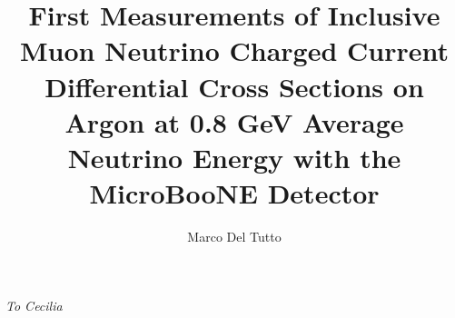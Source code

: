 \documentclass[a4paper, oneside, openany, 12pt]{book}
\begin{document}
\title{First Measurements of Inclusive Muon Neutrino Charged Current Differential Cross Sections on Argon at 0.8 GeV Average Neutrino Energy with the MicroBooNE Detector}

\author{Marco Del Tutto}







\begin{singlespacing}
\maketitle
\end{singlespacing}

\restoregeometry

\begin{singlespacing}
\begin{abstractseparate}
	 
\end{abstractseparate}
\end{singlespacing}

\begin{singlespacing}
\begin{originality}
	 
\end{originality}
\end{singlespacing}

\begin{singlespacing}
\begin{acknowledgements}
	 
\end{acknowledgements}
\end{singlespacing}


\clearpage
\begin{center}
\vspace*{4cm}
    {\it To Cecilia}
\end{center}
\clearpage

\setlength{\footskip}{50pt}




\begin{singlespacing}


\frontmatter 
{
\hypersetup{linkcolor=black}
\tableofcontents

\listoffigures
\listoftables
}
\end{singlespacing}
\end{document}
